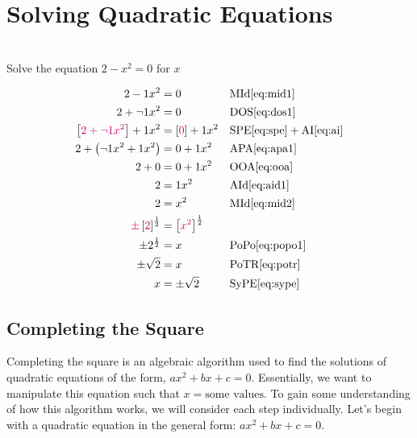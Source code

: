 \documentclass[20150903-160354-rs2.2-MarksMathNotebook.tex]{subfiles}
\begin{document}
\section{Solving Quadratic Equations}\label{Solving Quadratic Equations}

\begin{example}[id:20141107-131748] \label{20141107-131748}  \hfill \\

Solve the equation $2-x^2=0$ for $x$

\soln

\solnsteps
\begin{align*}
2-1x^2 &= 0 && \text{MId} \eqref{eq:mid1} \\
2+\neg 1 x^2 &= 0 && \text{DOS} \eqref{eq:dos1} \\
\left[\alert{2+\neg 1x^2} \right] + 1x^2 &= \left[\alert{0}\right]+ 1x^2 && \text{SPE} \eqref{eq:spe} + \text{AI} \eqref{eq:ai} \\
2 + \left(\neg 1x^2 + 1x^2 \right) &= 0 + 1x^2 && \text{APA} \eqref{eq:apa1} \\
2 + 0 &= 0 + 1x^2 && \text{OOA} \eqref{eq:ooa} \\
2 &= 1x^2 && \text{AId} \eqref{eq:aid1} \\
2 &= x^2 && \text{MId} \eqref{eq:mid2} \\
\alert{\pm} \left[\alert{2} \right]^{\frac{1}{2}} &= \left[\alert{x^2}\right]^{\frac{1}{2}} \\ %
\pm 2^{\frac{1}{2}} &= x && \text{PoPo} \eqref{eq:popo1} \\
\pm \sqrt{2} &= x && \text{PoTR} \eqref{eq:potr} \\
x &= \pm \sqrt{2} && \text{SyPE} \eqref{eq:sype}
\end{align*}
\end{example}

\subsection{Completing the Square}\label{Completing the Square}

Completing the square is an algebraic algorithm used to find the solutions of quadratic equations of the form, $ax^2+bx+c=0$.   Essentially, we want to manipulate this equation such that $x=\text{some values}$.  To gain some understanding of how this algorithm works, we will consider each step individually.  Let's begin with a quadratic equation in the general form: $ax^2+bx+c=0$.\\
\end{document}
